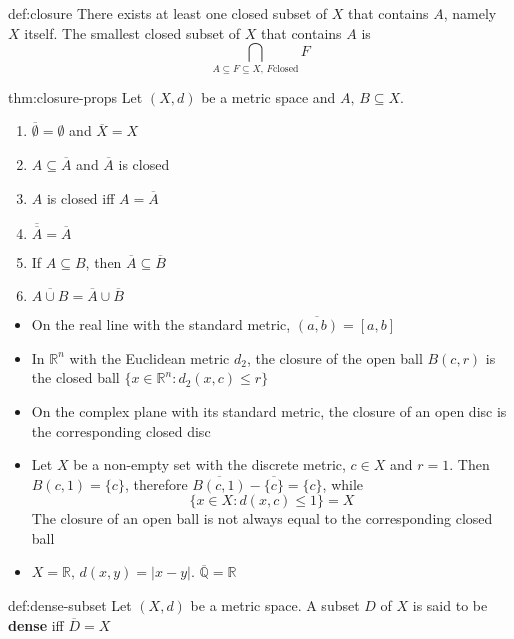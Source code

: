 \documentclass[landscape, 8pt]{extarticle}
\begin{document}
\begin{multicols}{3}
\begin{dfn}[Closure]{def:closure}{}
    There exists at least one closed subset of $X$ that contains $A$, namely $X$ itself. The smallest closed subset of $X$ that contains $A$ is
    \[\bigcap\limits_{A \subseteq F \subseteq X,\,F \text{closed}} F\]
\end{dfn}

\begin{thm}{thm:closure-props}{}
    Let $(X, d)$ be a metric space and $A,\,B \subseteq X$.
    \begin{enumerate}
        \item $\overline{\emptyset} = \emptyset$ and $\overline{X} = X$
        \item $A \subseteq \overline{A}$ and $\overline{A}$ is closed
        \item $A$ is closed iff $A = \overline{A}$
        \item $\overline{\overline{A}} = \overline{A}$
        \item If $A \subseteq B$, then $\overline{A} \subseteq \overline{B}$
        \item $\overline{A \cup B} = \overline{A} \cup \overline{B}$
    \end{enumerate}
\end{thm}

\begin{itemize}
    \item On the real line with the standard metric, $\overline{(a,b)} = [a,b]$
    \item In $\mathbb{R}^{n}$ with the Euclidean metric $d_{2}$, the closure of the open ball $B(c,r)$ is the closed ball $\{x\in\mathbb{R}^{n}: d_{2}(x,c)\le r\}$
    \item On the complex plane with its standard metric, the closure of an open disc is the corresponding closed disc
    \item Let $X$ be a non-empty set with the discrete metric, $c\in X$ and $r =1$. Then $B(c,1) = \{c\}$, therefore $\overline{B(c,1)} - \overline{\{c\}} = \{c\}$, while
        \[\{x\in X : d(x,c) \le 1\} = X\]
        The closure of an open ball is not always equal to the corresponding closed ball
    \item $X = \mathbb{R},\,d(x,y) = \lvert x - y \rvert$. $\overline{\mathbb{Q}} = \mathbb{R}$
\end{itemize}

\begin{dfn}{def:dense-subset}{}
    Let $(X, d)$ be a metric space. A subset $D$ of $X$ is said to be \textbf{dense} iff $\overline{D} = X$
\end{dfn}


\end{multicols}
\end{document}
